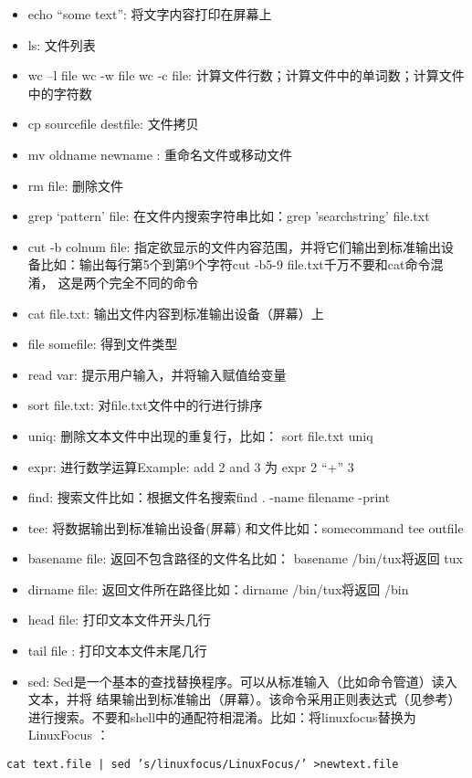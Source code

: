 \documentclass[]{book}
\providecommand{\tightlist}{%
  \setlength{\itemsep}{0pt}\setlength{\parskip}{0pt}}
\begin{document}
\begin{itemize}
\tightlist
\item
  echo ``some text'': 将文字内容打印在屏幕上
\item
  ls: 文件列表
\item
  wc --l file wc -w file wc -c file: 计算文件行数；计算文件中的单词数；计算文件中的字符数
\item
  cp sourcefile destfile: 文件拷贝
\item
  mv oldname newname : 重命名文件或移动文件
\item
  rm file: 删除文件
\item
  grep `pattern' file: 在文件内搜索字符串比如：grep 'searchstring' file.txt
\item
  cut -b colnum file: 指定欲显示的文件内容范围，并将它们输出到标准输出设备比如：输出每行第5个到第9个字符cut -b5-9 file.txt千万不要和cat命令混淆，
  这是两个完全不同的命令
\item
  cat file.txt: 输出文件内容到标准输出设备（屏幕）上
\item
  file somefile: 得到文件类型
\item
  read var: 提示用户输入，并将输入赋值给变量
\item
  sort file.txt: 对file.txt文件中的行进行排序
\item
  uniq: 删除文本文件中出现的重复行，比如： sort file.txt \textbar{} uniq
\item
  expr: 进行数学运算Example: add 2 and 3 为 expr 2 ``+'' 3
\item
  find: 搜索文件比如：根据文件名搜索find . -name filename -print
\item
  tee: 将数据输出到标准输出设备(屏幕) 和文件比如：somecommand \textbar{} tee outfile
\item
  basename file: 返回不包含路径的文件名比如： basename /bin/tux将返回 tux
\item
  dirname file: 返回文件所在路径比如：dirname /bin/tux将返回 /bin
\item
  head file: 打印文本文件开头几行
\item
  tail file : 打印文本文件末尾几行
\item
  sed: Sed是一个基本的查找替换程序。可以从标准输入（比如命令管道）读入文本，并将
  结果输出到标准输出（屏幕）。该命令采用正则表达式（见参考）进行搜索。不要和shell中的通配符相混淆。比如：将linuxfocus替换为 LinuxFocus ：
\end{itemize}

\begin{verbatim}
cat text.file | sed ’s/linuxfocus/LinuxFocus/’ >newtext.file
\end{verbatim}
\end{document}
